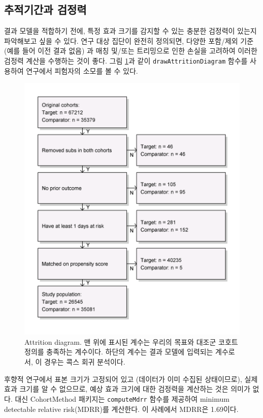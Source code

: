 \documentclass[10.5pt]{book}
\theoremstyle{definition}
\theoremstyle{definition}
\theoremstyle{definition}
\theoremstyle{remark}
\begin{document}
\subsection{추적기간과 검정력}\label{-}

결과 모델을 적합하기 전에, 특정 효과 크기를 감지할 수 있는 충분한
검정력이 있는지 파악해보고 싶을 수 있다. 연구 대상 집단이 완전히
정의되면, 다양한 포함/제외 기준 (예를 들어 이전 결과 없음) 과 매칭
및/또는 트리밍으로 인한 손실을 고려하여 이러한 검정력 계산을 수행하는
것이 좋다. 그림 \ref{fig:attrition}과 같이 \texttt{drawAttritionDiagram}
함수를 사용하여 연구에서 피험자의 소모를 볼 수 있다.

\begin{figure}

{\centering \includegraphics[width=0.7\linewidth]{images/PopulationLevelEstimation/attrition} 

}

\caption{Attrition diagram. 맨 위에 표시된 계수는 우리의 목표와 대조군 코호트 정의를 충족하는 계수이다. 하단의 계수는 결과 모델에 입력되는 계수로서, 이 경우는 콕스 회귀 분석이다.}\label{fig:attrition}
\end{figure}

후향적 연구에서 표본 크기가 고정되어 있고 (데이터가 이미 수집된
상태이므로), 실제 효과 크기를 알 수 없으므로, 예상 효과 크기에 대한
검정력을 계산하는 것은 의미가 없다. 대신 CohortMethod 패키지는
\texttt{computeMdrr} 함수를 제공하여 minimum detectable relative
risk(MDRR)를 계산한다. 이 사례에서 MDRR은 1.69이다.
 
\end{document}

